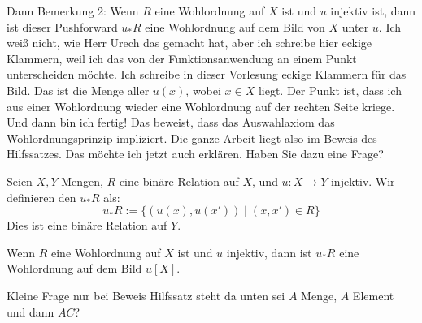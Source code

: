 \begin{spoken-clean}[00:40:50 - 00:42:10]
Dann Bemerkung 2: Wenn $R$ eine Wohlordnung auf $X$ ist und $u$ injektiv ist, dann ist dieser Pushforward $u_* R$ eine Wohlordnung auf dem Bild von $X$ unter $u$. Ich weiß nicht, wie Herr Urech das gemacht hat, aber ich schreibe hier eckige Klammern, weil ich das von der Funktionsanwendung an einem Punkt unterscheiden möchte. Ich schreibe in dieser Vorlesung eckige Klammern für das Bild. Das ist die Menge aller $u(x)$, wobei $x \in X$ liegt. Der Punkt ist, dass ich aus einer Wohlordnung wieder eine Wohlordnung auf der rechten Seite kriege. Und dann bin ich fertig! Das beweist, dass das Auswahlaxiom das Wohlordnungsprinzip impliziert. Die ganze Arbeit liegt also im Beweis des Hilfssatzes. Das möchte ich jetzt auch erklären. Haben Sie dazu eine Frage?
\end{spoken-clean}

\begin{math-stroke}

\begin{remark}
Seien $X, Y$ Mengen, $R$ eine binäre Relation auf $X$, und $u: X \to Y$ injektiv.
Wir definieren den  $u_* R$ als:
\[
u_* R := \{ (u(x), u(x')) \mid (x, x') \in R \}
\]
Dies ist eine binäre Relation auf $Y$.
\end{remark}

\begin{remark}
Wenn $R$ eine Wohlordnung auf $X$ ist und $u$ injektiv, dann ist $u_* R$ eine Wohlordnung auf dem Bild $u[X]$.
\end{remark}
\end{math-stroke}

\begin{student-interaction}[Studentenfrage]
Kleine Frage nur bei Beweis Hilfssatz steht da unten sei $A$ Menge, $A$ Element und dann $AC$?
\end{student-interaction}

